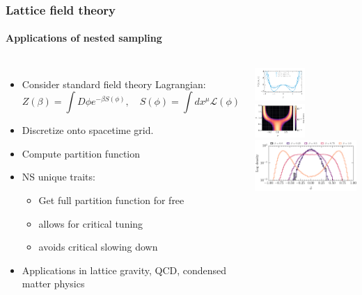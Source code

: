 \documentclass[aspectratio=169]{beamer}
\begin{document}
\begin{frame}
    \frametitle{Lattice field theory}
    \framesubtitle{Applications of nested sampling}
    \begin{columns}
        \begin{itemize}
            \item Consider standard field theory Lagrangian:
                \[ Z(\beta) = \int D\phi e^{-\beta S(\phi)}, \quad S(\phi) = \int dx^\mu \mathcal{L}(\phi) \]
            \item Discretize onto spacetime grid.
            \item Compute partition function
            \item NS unique traits:
                \begin{itemize}
                    \item Get full partition function for free
                    \item allows for critical tuning
                    \item avoids critical slowing down
                \end{itemize}
            \item Applications in lattice gravity, QCD, condensed matter physics
        \end{itemize}
        \includegraphics[width=0.49\textwidth]{figures/potential_shape}
        \includegraphics[width=0.49\textwidth]{figures/2d_phase}
        \includegraphics[width=\textwidth]{figures/lattice_field_theory.pdf}
    \end{columns}
\end{frame}
\end{document}
